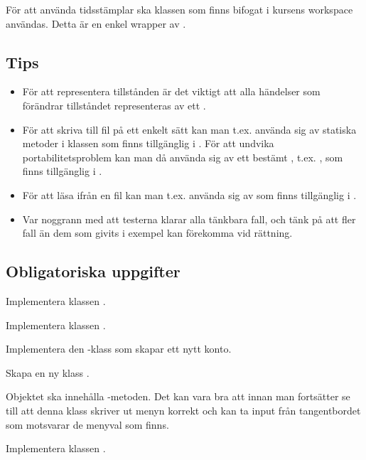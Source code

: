 För att använda tidsstämplar ska klassen  som finns bifogat i kursens workspace användas. Detta är en enkel wrapper av .


\subsection{Tips} 

\begin{itemize}
\item För att representera tillstånden är det viktigt att alla händelser som förändrar tillståndet representeras av ett .

\item För att skriva till fil på ett enkelt sätt kan man t.ex. använda sig av statiska metoder i klassen  som finns tillgänglig i . För att undvika portabilitetsproblem kan man då använda sig av ett bestämt , t.ex. , som finns tillgänglig i \newline{}.

\item För att läsa ifrån en fil kan man t.ex. använda sig av  som finns tillgänglig i . 

\item Var noggrann med att testerna klarar alla tänkbara fall, och tänk på att fler fall än dem som givits i exempel kan förekomma vid rättning.
\end{itemize}

\subsection{Obligatoriska uppgifter}

\Task Implementera klassen .

\Task Implementera klassen .

\Task Implementera den -klass som skapar ett nytt konto.

\Task Skapa en ny klass .

\Subtask Objektet  ska innehålla -metoden. Det kan vara bra att innan man fortsätter se till att denna klass skriver ut menyn korrekt och kan ta input från tangentbordet som motsvarar de menyval som finns.

\Task Implementera klassen .

